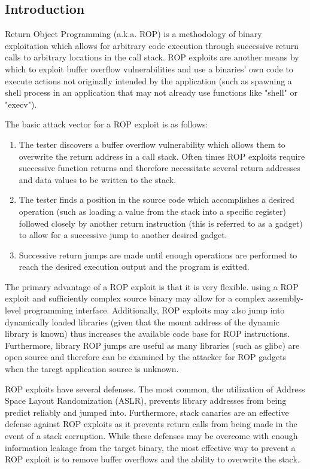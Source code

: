 \documentclass{article}
\begin{document}
\begin{multicols}{2}
    \section{Introduction}
    \par Return Object Programming (a.k.a. ROP) is a methodology of binary exploitation which allows for arbitrary code execution through successive return calls to arbitrary locations in the call stack. ROP exploits are another means by which to exploit buffer overflow vulnerabilities and use a binaries' own code to execute actions not originally intended by the application (such as spawning a shell process in an application that may not already use functions like "shell" or "execv").
    \par The basic attack vector for a ROP exploit is as follows:
    \begin{enumerate}
        \item The tester discovers a buffer overflow vulnerability which allows them to overwrite the return address in a call stack. Often times ROP exploits require successive function returns and therefore necessitate several return addresses and data values to be written to the stack.
        \item The tester finds a position in the source code which accomplishes a desired operation (such as loading a value from the stack into a specific register) followed closely by another return instruction (this is referred to as a gadget) to allow for a successive jump to another desired gadget.
        \item Successive return jumps are made until enough operations are performed to reach the desired execution output and the program is exitted.
    \end{enumerate}
    \par The primary advantage of a ROP exploit is that it is very flexible. using a ROP exploit and sufficiently complex source binary may allow for a complex assembly-level programming interface. Additionally, ROP exploits may also jump into dynamically loaded libraries (given that the mount address of the dynamic library is known) thus increases the available code base for ROP instructions. Furthermore, library ROP jumps are useful as many libraries (such as glibc) are open source and therefore can be examined by the attacker for ROP gadgets when the taregt application source is unknown.
    \par ROP exploits have several defenses. The most common, the utilization of Address Space Layout Randomization (ASLR), prevents library addresses from being predict reliably and jumped into. Furthermore, stack canaries are an effective defense against ROP exploits as it prevents return calls from being made in the event of a stack corruption. While these defenses may be overcome with enough information leakage from the target binary, the most effective way to prevent a ROP exploit is to remove buffer overflows and the ability to overwrite the stack.

\end{multicols}
\end{document}
